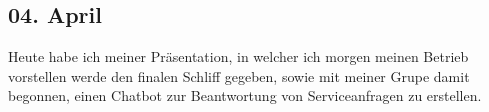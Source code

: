 \subsection{04. April}
Heute habe ich meiner Präsentation, in welcher ich morgen meinen Betrieb vorstellen werde den finalen Schliff gegeben, sowie mit meiner Grupe damit begonnen, einen Chatbot zur Beantwortung von Serviceanfragen zu erstellen.
